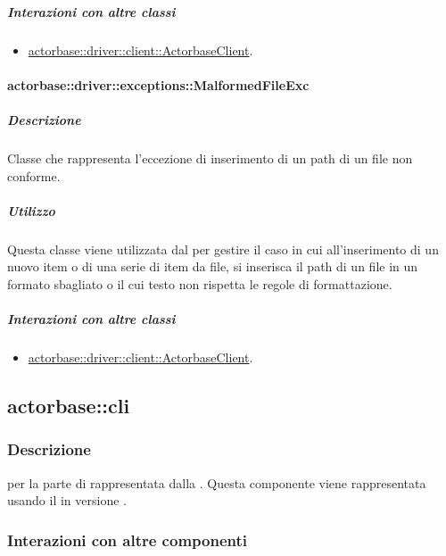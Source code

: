 \documentclass{scalatekids-article}
\begin{document}
\subparagraph{Interazioni con altre classi}

\begin{itemize}
	\item \hyperref[sec:actorbase::driver::client::ActorbaseClient]{actorbase::driver::client::ActorbaseClient}.
\end{itemize}

\paragraph{actorbase::driver::exceptions::MalformedFileExc}

\subparagraph{Descrizione}

Classe che rappresenta l'eccezione di inserimento di un path di un file non conforme.

\subparagraph{Utilizzo}

Questa classe viene utilizzata dal  per gestire il caso in cui all'inserimento di un nuovo item o di una serie di item da file, si inserisca il path di un file in un formato sbagliato o il cui testo non rispetta le regole di formattazione.

\subparagraph{Interazioni con altre classi}

\begin{itemize}
	\item \hyperref[sec:actorbase::driver::client::ActorbaseClient]{actorbase::driver::client::ActorbaseClient}.
\end{itemize}


\subsection{actorbase::cli}
\label{sec:actorbase::cli}

\subsubsection{Descrizione}

 per la parte di  rappresentata dalla .
Questa componente viene rappresentata usando il 
 in versione .

\subsubsection{Interazioni con altre componenti}
\end{document}
